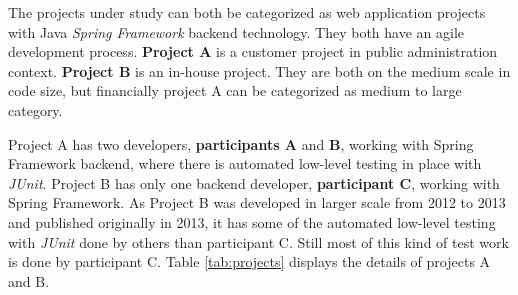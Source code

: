 The projects under study can both be categorized as web application projects with Java \textit{Spring Framework} backend technology.
They both have an agile development process. \textbf{Project A} is a customer project in public administration context.
\textbf{Project B} is an in-house project. They are both on the medium scale in code size, but financially project A can be
categorized as medium to large category.

Project A has two developers, \textbf{participants A} and \textbf{B}, working with Spring Framework backend,
where there is automated low-level testing in place with \textit{JUnit}.
Project B has only one backend developer, \textbf{participant C}, working with Spring Framework. As Project B
was developed in larger scale from 2012 to 2013 and published originally in 2013, it has some of the automated
low-level testing with \textit{JUnit} done by others than participant C. Still most of this kind of test work is done by participant C.
Table \ref{tab:projects} displays the details of projects A and B.
